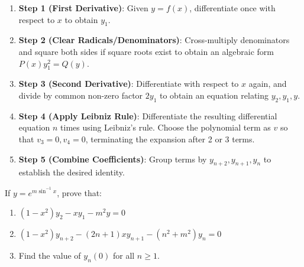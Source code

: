 \begin{methodbox}
\begin{enumerate}[leftmargin=1.5em]
    \item \textbf{Step 1 (First Derivative)}: Given $y = f(x)$, differentiate once with respect to $x$ to obtain $y_1$.
    \item \textbf{Step 2 (Clear Radicals/Denominators)}: Cross-multiply denominators and square both sides if square roots exist to obtain an algebraic form $P(x) y_1^2 = Q(y)$.
    \item \textbf{Step 3 (Second Derivative)}: Differentiate with respect to $x$ again, and divide by common non-zero factor $2y_1$ to obtain an equation relating $y_2, y_1, y$.
    \item \textbf{Step 4 (Apply Leibniz Rule)}: Differentiate the resulting differential equation $n$ times using Leibniz's rule. Choose the polynomial term as $v$ so that $v_3 = 0, v_4 = 0$, terminating the expansion after 2 or 3 terms.
    \item \textbf{Step 5 (Combine Coefficients)}: Group terms by $y_{n+2}, y_{n+1}, y_n$ to establish the desired identity.
\end{enumerate}
\end{methodbox}

\begin{example}[Leibniz Differentiation \& Evaluation at $x=0$]
If $y = e^{m\sin^{-1}x}$, prove that:
\begin{enumerate}[label=(\alph*)]
    \item $(1-x^2)y_2 - x y_1 - m^2 y = 0$
    \item $(1-x^2)y_{n+2} - (2n+1)x y_{n+1} - (n^2+m^2)y_n = 0$
    \item Find the value of $y_n(0)$ for all $n \ge 1$.
\end{enumerate}
\end{example}

